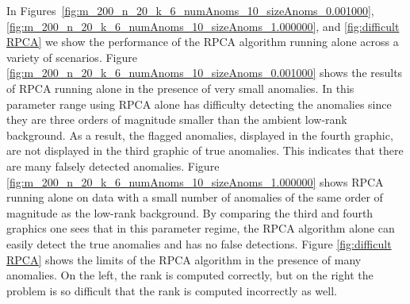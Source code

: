 \documentclass[conference]{IEEEtran}
\begin{document}
In Figures~\ref{fig:m_200_n_20_k_6_numAnoms_10_sizeAnoms_0.001000}, \ref{fig:m_200_n_20_k_6_numAnoms_10_sizeAnoms_1.000000}, and
\ref{fig:difficult RPCA} we show the performance of the RPCA algorithm running alone across a variety of scenarios. 
Figure \ref{fig:m_200_n_20_k_6_numAnoms_10_sizeAnoms_0.001000} shows the results of RPCA running alone in the presence of very small anomalies.   In this parameter range using RPCA alone has difficulty detecting the anomalies since they are three orders of magnitude smaller than the ambient low-rank background.  As a result, the flagged anomalies, displayed in the fourth graphic, are not displayed in the third graphic of true anomalies. This   indicates that there are many falsely detected anomalies.
Figure \ref{fig:m_200_n_20_k_6_numAnoms_10_sizeAnoms_1.000000} shows RPCA running alone on data with a small number of anomalies of the same order of magnitude as the low-rank background.  By comparing the third and fourth graphics one sees that in this parameter regime, the RPCA algorithm alone can easily detect the true anomalies and has no false detections.  
Figure \ref{fig:difficult RPCA} shows the limits of the RPCA algorithm in the presence of many anomalies.   On the left, the rank is computed correctly, but on the right the problem is so difficult that the rank is computed incorrectly as well.
 

\end{document}
